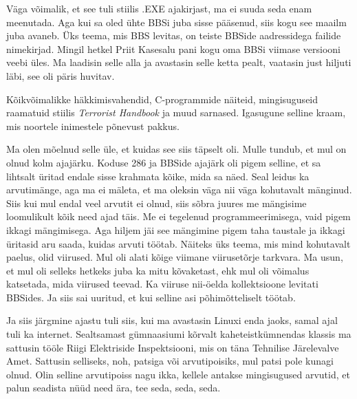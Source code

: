 Väga võimalik, et see tuli stiilis .EXE ajakirjast, ma ei suuda seda enam meenutada. Aga kui sa oled ühte BBSi juba sisse pääsenud, siis kogu see maailm juba avaneb. Üks teema, mis BBS levitas, on teiste BBSide aadressidega failide nimekirjad. Mingil hetkel Priit Kasesalu pani kogu oma BBSi viimase versiooni veebi üles. Ma laadisin selle alla ja avastasin selle  ketta pealt, vaatasin just hiljuti läbi,  see oli  päris huvitav. 


Kõikvõimalikke häkkimisvahendid, C-programmide näiteid, mingisuguseid raamatuid stiilis \emph{Terrorist Handbook} ja muud sarnased. Igasugune selline kraam, mis  noortele inimestele põnevust pakkus.


Ma olen mõelnud selle üle, et kuidas see siis täpselt oli. Mulle tundub, et mul on olnud  kolm  ajajärku. Koduse 286 ja BBSide ajajärk oli pigem selline, et sa lihtsalt üritad endale sisse krahmata kõike, mida sa näed. Seal leidus ka arvutimänge, aga ma ei mäleta, et ma oleksin väga nii väga kohutavalt mänginud. Siis kui mul endal veel arvutit ei olnud, siis sõbra juures me mängisime loomulikult kõik need ajad täis. Me ei tegelenud programmeerimisega, vaid pigem ikkagi mängimisega. Aga hiljem jäi see mängimine pigem taha taustale ja ikkagi üritasid aru saada, kuidas arvuti töötab. Näiteks üks teema, mis mind kohutavalt paelus, olid viirused. Mul oli alati kõige viimane viirusetõrje tarkvara. Ma usun, et mul oli selleks hetkeks juba ka mitu kõvaketast, ehk mul oli võimalus katsetada, mida viirused teevad. Ka  viiruse nii-öelda kollektsioone levitati BBSides. Ja siis sai uuritud, et kui selline asi  põhimõtteliselt  töötab. 

Ja siis järgmine ajastu tuli siis, kui ma avastasin Linuxi enda jaoks, samal ajal tuli ka internet. Sealtsamast gümnaasiumi kõrvalt kaheteistkümnendas klassis ma sattusin tööle Riigi Elektriside Inspektsiooni, mis on täna Tehnilise Järelevalve Amet. Sattusin selliseks, noh,  patsiga või arvutipoisiks, mul patsi pole kunagi olnud. Olin selline arvutipoiss nagu ikka, kellele antakse mingisugused arvutid, et palun seadista nüüd need ära,  tee seda, seda, seda.


